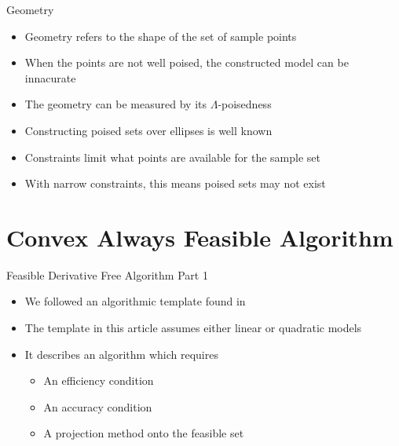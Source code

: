\documentclass{beamer}
\begin{document}
\begin{frame}{Geometry}
    \begin{itemize}
        \item<1, 2, 3> Geometry refers to the shape of the set of sample points
        \item<1, 2, 3> When the points are not well poised, the constructed model can be innacurate \\
        \item<3> The geometry can be measured by its $\Lambda$-poisedness
        \item<3> Constructing poised sets over ellipses is well known
        \item<3> Constraints limit what points are available for the sample set
        \item<3> With narrow constraints, this means poised sets may not exist
    \end{itemize}
\end{frame}


\section{Convex Always Feasible Algorithm}


\begin{frame}{Feasible Derivative Free Algorithm Part 1}
    \begin{itemize}
        \item We followed an algorithmic template found in \cite{CONEJO2013324}
        \item The template in this article assumes either linear or quadratic models
        \item It describes an algorithm which requires
            \begin{itemize}
                \item An efficiency condition
                \item An accuracy condition
                \item A projection method onto the feasible set
            \end{itemize}
    \end{itemize}
\end{frame}
\end{document}
